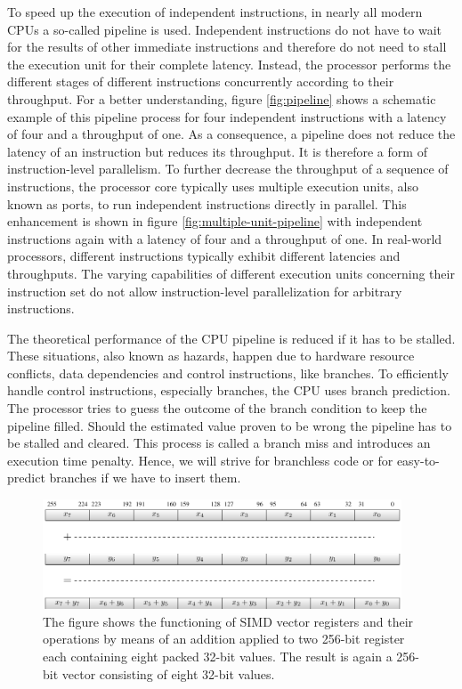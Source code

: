 \documentclass{stdlocal}
\begin{document}
    To speed up the execution of independent instructions, in nearly all modern CPUs a so-called pipeline is used.
    Independent instructions do not have to wait for the results of other immediate instructions and therefore do not need to stall the execution unit for their complete latency.
    Instead, the processor performs the different stages of different instructions concurrently according to their throughput.
    For a better understanding, figure \ref{fig:pipeline} shows a schematic example of this pipeline process for four independent instructions with a latency of four and a throughput of one.
    As a consequence, a pipeline does not reduce the latency of an instruction but reduces its throughput.
    It is therefore a form of instruction-level parallelism.
    To further decrease the throughput of a sequence of instructions, the processor core typically uses multiple execution units, also known as ports, to run independent instructions directly in parallel.
    This enhancement is shown in figure \ref{fig:multiple-unit-pipeline} with independent instructions again with a latency of four and a throughput of one.
    In real-world processors, different instructions typically exhibit different latencies and throughputs.
    The varying capabilities of different execution units concerning their instruction set do not allow instruction-level parallelization for arbitrary instructions.
    \autocite{dolbeau2016,fog2019a,fog2019d,intel-kaby-lake,intel-intrinsics-guide}

    The theoretical performance of the CPU pipeline is reduced if it has to be stalled.
    These situations, also known as hazards, happen due to hardware resource conflicts, data dependencies and control instructions, like branches.
    To efficiently handle control instructions, especially branches, the CPU uses branch prediction.
    The processor tries to guess the outcome of the branch condition to keep the pipeline filled.
    Should the estimated value proven to be wrong the pipeline has to be stalled and cleared.
    This process is called a branch miss and introduces an execution time penalty.
    Hence, we will strive for branchless code or for easy-to-predict branches if we have to insert them.
    \autocite{hennessy2019,patterson2014,fog2019a}

    \begin{figure}
      \center
      \includegraphics[width=0.95\textwidth]{figures/simd_vector_operations.pdf}
      \caption[SIMD Vector Registers and Operations]{%
        The figure shows the functioning of SIMD vector registers and their operations by means of an addition applied to two 256-bit register each containing eight packed 32-bit values.
        The result is again a 256-bit vector consisting of eight 32-bit values.
      }
      \label{fig:simd-vector-operation}
    \end{figure}
\end{document}
